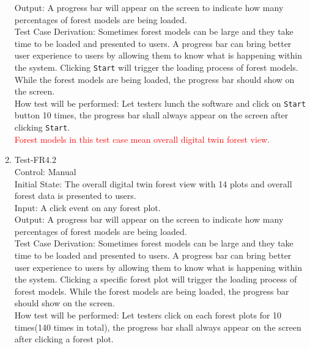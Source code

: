 \documentclass[12pt, titlepage]{article}
\begin{document}
\begin{enumerate}
Output: A progress bar will appear on the screen to indicate how many
percentages of forest models are being loaded.\\

Test Case Derivation: Sometimes forest models can be large and they take
time to be loaded and presented to users. A progress bar can bring better
user experience to users by allowing them to know what is happening within the 
system. Clicking \verb|Start| will trigger the loading process of forest models.
While the forest models are being loaded, the progress bar should show on the screen.\\
					
How test will be performed: Let testers lunch the software and click on 
\verb|Start| button 10 times, the progress bar 
shall always appear on the screen after clicking
\verb|Start|.\\

\textcolor{red}{Forest models in this test case mean overall 
digital twin forest view.}

\item{Test-FR4.2\\}
Control: Manual\\ 

Initial State: The overall digital twin forest view with 14 plots 
and overall forest data is presented to users.\\

Input: A click event on any forest plot.\\

Output: A progress bar will appear on the screen to indicate how many
percentages of forest models are being loaded.\\

Test Case Derivation: Sometimes forest models can be large and they take
time to be loaded and presented to users. A progress bar can bring better
user experience to users by allowing them to know what is happening within the 
system. Clicking a specific forest plot will trigger the loading process of 
forest models. While the forest models are being loaded, the progress bar 
should show on the screen.\\
					
How test will be performed: Let testers click on each forest plots for 10 times(140 
times in total), the progress bar shall always appear on the screen after clicking
a forest plot.\\


\end{enumerate}
\end{document}
